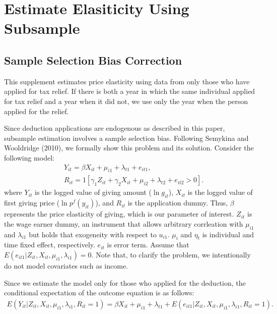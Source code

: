 \documentclass[
  11pt,
  a4paper,
]{article}
\begin{document}
\clearpage

\hypertarget{estimate-elasiticity-using-subsample}{%
\section{Estimate Elasiticity Using Subsample}\label{estimate-elasiticity-using-subsample}}

\hypertarget{sample-selection-bias-correction}{%
\subsection{Sample Selection Bias Correction}\label{sample-selection-bias-correction}}

This supplement estimates price elasticity
using data from only those who have applied for tax relief.
If there is both
a year in which the same individual applied for tax relief
and a year when it did not,
we use only the year when the person applied for the relief.

Since deduction applications are endogenous as described in this paper,
subsample estimation involves a sample selection bias.
Following Semykina and Wooldridge (2010), we formally show this problem and its solution.
Consider the following model:
\begin{align}
  &Y_{it} = \beta  X_{it} + \mu_{i1} + \lambda_{t1} + e_{it1}, \\
  &R_{it} = 1[\gamma_1 Z_{it} + \gamma_2 X_{it} + \mu_{i2} + \lambda_{t2} + e_{it2} > 0].
\end{align}
where \(Y_{it}\) is the logged value of giving amount (\(\ln g_{it}\)),
\(X_{it}\) is the logged value of first giving price (\(\ln p^f(y_{it})\)),
and \(R_{it}\) is the application dummy.
Thus, \(\beta\) represents the price elasticity of giving,
which is our parameter of interest.
\(Z_{it}\) is the wage earner dummy,
an instrument that allows arbitrary corrleation
with \(\mu_{i1}\) and \(\lambda_{i1}\) but
holds that exogeneity with respect to \(u_{i1}\).
\(\mu_i\) and \(\eta_t\) is individual and time fixed effect, respectively.
\(e_{it}\) is error term.
Assume that \(E(e_{it1} |Z_{it}, X_{it}, \mu_{i1}, \lambda_{i1}) = 0\).
Note that, to clarify the problem,
we intentionally do not model covariates such as income.

Since we estimate the model only for those who applied for the deduction,
the conditional expectation of the outcome equation is as follows:
\begin{align}
  E(Y_{it} |Z_{it}, X_{it}, \mu_{i1}, \lambda_{i1}, R_{it} = 1)
  = \beta  X_{it} + \mu_{i1} + \lambda_{t1}
  + E(e_{it1} |Z_{it}, X_{it}, \mu_{i1}, \lambda_{i1}, R_{it} = 1).
\end{align}
\end{document}
